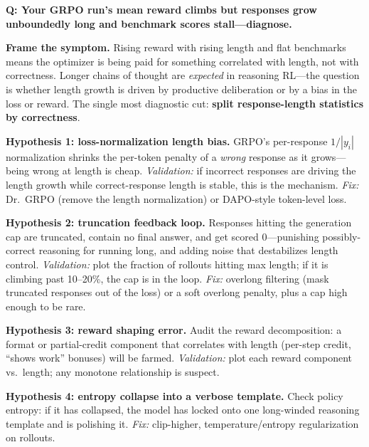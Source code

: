 
\begin{interviewq}
\textbf{Q: Your GRPO run's mean reward climbs but responses grow unboundedly long and benchmark scores stall---diagnose.}

 \quad {} \quad \badgefreq{\freqmed}

\stronganswer

\textbf{Frame the symptom.} Rising reward with rising length and flat benchmarks means the optimizer is being paid for something correlated with length, not with correctness. Longer chains of thought are \textit{expected} in reasoning RL---the question is whether length growth is driven by productive deliberation or by a bias in the loss or reward. The single most diagnostic cut: \textbf{split response-length statistics by correctness}.

\textbf{Hypothesis 1: loss-normalization length bias.} GRPO's per-response $1/|y_i|$ normalization shrinks the per-token penalty of a \textit{wrong} response as it grows---being wrong at length is cheap. \textit{Validation:} if incorrect responses are driving the length growth while correct-response length is stable, this is the mechanism. \textit{Fix:} Dr.~GRPO (remove the length normalization) or DAPO-style token-level loss.

\textbf{Hypothesis 2: truncation feedback loop.} Responses hitting the generation cap are truncated, contain no final answer, and get scored $0$---punishing possibly-correct reasoning for running long, and adding noise that destabilizes length control. \textit{Validation:} plot the fraction of rollouts hitting max length; if it is climbing past 10--20\%, the cap is in the loop. \textit{Fix:} overlong filtering (mask truncated responses out of the loss) or a soft overlong penalty, plus a cap high enough to be rare.

\textbf{Hypothesis 3: reward shaping error.} Audit the reward decomposition: a format or partial-credit component that correlates with length (per-step credit, ``shows work'' bonuses) will be farmed. \textit{Validation:} plot each reward component vs.\ length; any monotone relationship is suspect.

\textbf{Hypothesis 4: entropy collapse into a verbose template.} Check policy entropy: if it has collapsed, the model has locked onto one long-winded reasoning template and is polishing it. \textit{Fix:} clip-higher, temperature/entropy regularization on rollouts.


\end{interviewq}
